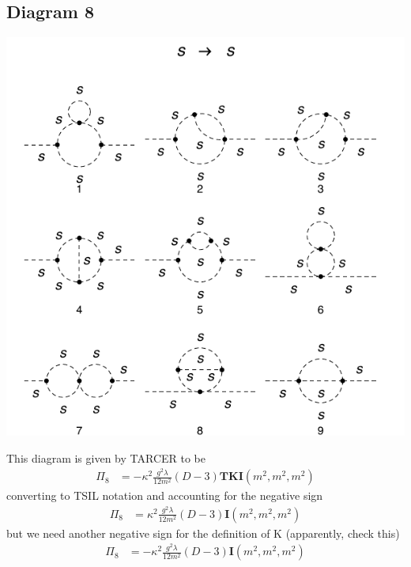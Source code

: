 \documentclass[11pt]{article}
\begin{document}
\subsection*{Diagram 8}
\begin{center}
\includegraphics{2loop_8.pdf}
\end{center}
This diagram is given by TARCER to be
\begin{align}
\Pi_8 & = - \kappa^2\frac{g^2 \lambda}{12 m^2 } (D-3) \mathbf{TKI}(m^2,m^2,m^2)
\end{align}
converting to TSIL notation and accounting for the negative sign
\begin{align}
\Pi_8 & =  \kappa^2\frac{g^2 \lambda}{12 m^2 } (D-3) \mathbf{I}(m^2,m^2,m^2)
\end{align}
but we need another negative sign for the definition of K (apparently, check this)
\begin{align}
\Pi_8 & =  -\kappa^2\frac{g^2 \lambda}{12 m^2 } (D-3) \mathbf{I}(m^2,m^2,m^2)
\end{align}
\end{document}
